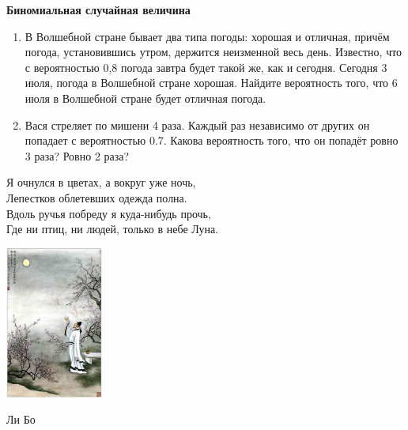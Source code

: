 \documentclass[pdftex,12pt,a4paper]{article}
\begin{document}
\textbf{Биномиальная случайная величина}

\begin{enumerate}
\item В Волшебной стране бывает два типа погоды: хорошая и отличная, причём погода, установившись утром, держится неизменной весь день. Известно, что с вероятностью 0,8 погода завтра будет такой же, как и сегодня. Сегодня 3 июля, погода в Волшебной стране хорошая. Найдите вероятность того, что 6 июля в Волшебной стране будет отличная погода.

\item Вася стреляет по мишени 4 раза. Каждый раз независимо от других он попадает с вероятностью 0.7. Какова вероятность того, что он попадёт ровно 3 раза? Ровно 2 раза?
\end{enumerate}

\vspace{50pt}

\begin{flushleft}
Я очнулся в цветах, а вокруг уже ночь,  \\
Лепестков облетевших одежда полна.  \\
Вдоль ручья побреду я куда-нибудь прочь,  \\
Где ни птиц, ни людей, только в небе Луна.  
\end{flushleft}


\begin{flushright}
\includegraphics[height=50mm]{libo_moon.jpg}

Ли Бо 
\end{flushright}
\end{document}
